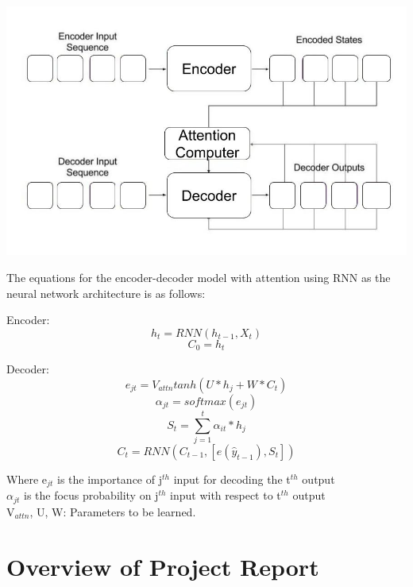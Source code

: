 				\begin{center}
				\includegraphics[width=\linewidth]{figures/Attention-Model.jpg}	
				\label{fig: Encoder - Decoder Mechanism with Attention}
				\end{center}

The equations for the encoder-decoder model with attention using RNN as the neural network architecture is as follows:

Encoder: \begin{equation} h_{t} = RNN(h_{t-1}, X_{t}) \end{equation}
		\begin{equation} C_{0} = h_{t}  \end{equation}

Decoder: \begin{equation} e_{jt} = V_{attn} tanh(U * h_{j} + W * C_{t}) \end{equation}	
		 \begin{equation} \alpha_{jt} = softmax(e_{jt})  \end{equation}
		 \begin{equation} S_{t} = \sum_{j=1}^t\alpha_{it} * h_{j}  \end{equation}  
		 \begin{equation} C_{t} = RNN(C_{t-1}, [e(\hat{y}_{t-1}), S_{t}])  \end{equation} 

Where e$_{jt}$ is the importance of j$^{th}$ input for decoding the t$^{th}$ output  \\
$\alpha$$_{jt}$ is the focus probability on j$^{th}$ input with respect to t$^{th}$ output\\
V$_{attn}$, U, W: Parameters to be learned.
	


\section{Overview of Project Report}

